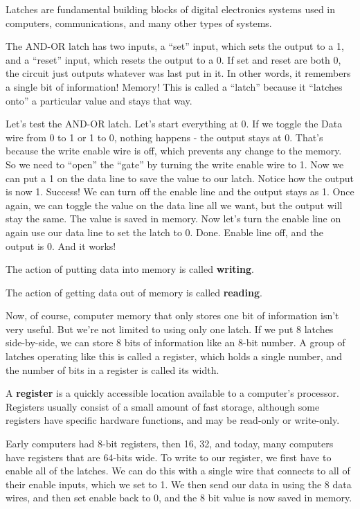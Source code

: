 Latches are fundamental building blocks of digital electronics systems used in computers, communications, and many
other types of systems.

\be
The AND-OR latch has two inputs, a ``set'' input, which sets the output to a 1, and a ``reset'' input, which resets the
output to a 0. If set and reset are both 0, the circuit just outputs whatever was last put in it. In other words, it
remembers a single bit of information! Memory! This is called a ``latch'' because it ``latches onto'' a particular
value and stays that way.


Let's test the AND-OR latch. Let's start everything at 0. If we toggle the Data wire from 0 to 1 or 1 to 0, nothing
happens - the output stays at 0. That's because the write enable wire is off, which prevents any change to the
memory. So we need to ``open'' the ``gate'' by turning the write enable wire to 1. Now we can put a 1 on the data
line to save the value to our latch. Notice how the output is now 1. Success! We can turn off the enable line and the
output stays as 1. Once again, we can toggle the value on the data line all we want, but the output will stay the
same. The value is saved in memory. Now let's turn the enable line on again use our data line to set the latch to 0.
Done. Enable line off, and the output is 0. And it works!
\ee

\bd[Writing]
The action of putting data into memory is called \textbf{writing}.
\ed

\bd[Reading]
The action of getting data out of memory is called \textbf{reading}.
\ed

Now, of course, computer memory that only stores one bit of information isn't very useful. But we're not limited to
using only one latch. If we put 8 latches side-by-side, we can store 8 bits of information like an 8-bit number. A
group of latches operating like this is called a register, which holds a single number, and the number of bits in a
register is called its width.

\bd[Register]
A \textbf{register} is a quickly accessible location available to a computer's processor. Registers usually consist
of a small amount of fast storage, although some registers have specific hardware functions, and may be read-only or
write-only.
\ed

Early computers had 8-bit registers, then 16, 32, and today, many computers have registers that are 64-bits wide. To
write to our register, we first have to enable all of the latches. We can do this with a single wire that connects to
all of their enable inputs, which we set to 1. We then send our data in using the 8 data wires, and then set enable
back to 0, and the 8 bit value is now saved in memory.

